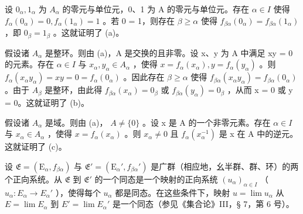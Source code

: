 设 \(0_{\alpha}, 1_{\alpha}\) 为 \(A_{\alpha}\) 的零元与单位元，0、1 为 A 的零元与单位元。存在 \(\alpha \in I\) 使得 \(f_{\alpha}(0_{\alpha}) = 0, f_{\alpha}(1_{\alpha}) = 1\) 。若 0 = 1，则存在 \(\beta \geqslant \alpha\) 使得 \(f_{\beta \alpha}(0_{\alpha}) = f_{\beta \alpha}(1_{\alpha})\) ，即 \(0_{\beta} = 1_{\beta}\) 。这就证明了 (a)。

假设诸 \(A_{\alpha}\) 是整环。则由 (a)，A 是交换的且非零。设 x、y 为 A 中满足 xy = 0 的元素。存在 \(\alpha \in I\) 与 \(x_{\alpha}, y_{\alpha} \in A_{\alpha}\) ，使得 \(x = f_{\alpha}(x_{\alpha}), y = f_{\alpha}(y_{\alpha})\) 。则 \(f_{\alpha}(x_{\alpha}y_{\alpha}) = xy = 0 = f_{\alpha}(0_{\alpha})\) 。因此存在 \(\beta \geqslant \alpha\) 使得 \(f_{\beta\alpha}(x_{\alpha}y_{\alpha}) = f_{\beta\alpha}(0_{\alpha})\) 。由于 \(A_{\beta}\) 是整环，由此得 \(f_{\beta\alpha}(x_{\alpha}) = 0_{\beta}\) 或 \(f_{\beta\alpha}(y_{\alpha}) = 0_{\beta}\) ，从而 x = 0 或 y = 0。这就证明了 (b)。

假设诸 \(A_{\alpha}\) 是域。则由 (a)， \(A \neq \{0\}\) 。设 x 是 A 的一个非零元素。存在 \(\alpha \in I\) 与 \(x_{\alpha} \in A_{\alpha}\) ，使得 \(x = f_{\alpha}(x_{\alpha})\) 。则 \(x_{\alpha} \neq 0\) 且 \(f_{\alpha}(x_{\alpha}^{-1})\) 是 x 在 A 中的逆元。这就证明了 (c)。

设 \(\mathfrak{E} = (\mathrm{E}_{\alpha}, f_{\beta \alpha})\) 与 \(\mathfrak{E}' = (\mathrm{E}_{\alpha}', f_{\beta \alpha}')\) 是广群（相应地，幺半群、群、环）的两个正向系统。从 \(\mathfrak{E}\) 到 \(\mathfrak{E}'\) 的一个同态是一个映射的正向系统 \((u_{\alpha})_{\alpha \in I}\) （ \(u_{\alpha} \colon E_{\alpha} \to E_{\alpha}'\) ），使得每个 \(u_{\alpha}\) 都是同态。在这些条件下，映射 \(u = \lim u_{\alpha}\) 从 \(E = \lim E_{\alpha}\) 到 \(E' = \lim E_{\alpha}'\) 是一个同态（参见《集合论》III，§ 7，第 6 号）。

